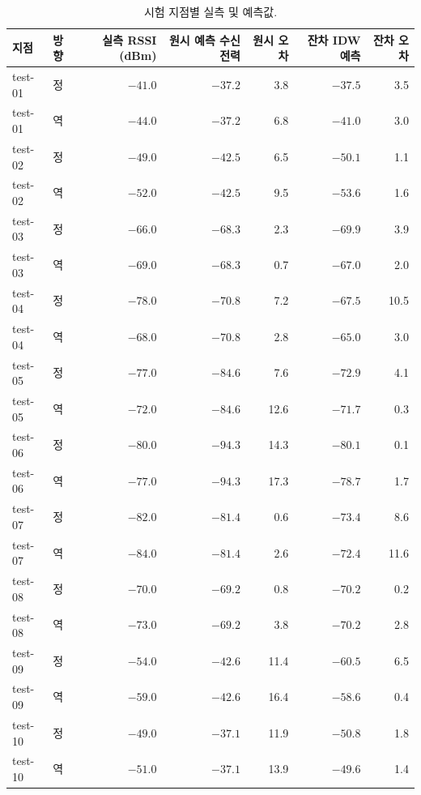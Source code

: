 \documentclass[11pt,a4paper]{article}
\begin{document}
\begin{table}[htbp]
  \centering\small
  \caption{시험 지점별 실측 및 예측값.}
  \label{tab:a2}
  \begin{tabular}{@{}llrrrrr@{}}
    \toprule
    지점 & 방향 & 실측 RSSI (dBm) & 원시 예측 수신 전력 & 원시 오차 & 잔차 IDW 예측 & 잔차 오차 \\
    \midrule
    test-01 & 정 & $-41.0$ & $-37.2$ & 3.8  & $-37.5$ & 3.5 \\
    test-01 & 역 & $-44.0$ & $-37.2$ & 6.8  & $-41.0$ & 3.0 \\
    test-02 & 정 & $-49.0$ & $-42.5$ & 6.5  & $-50.1$ & 1.1 \\
    test-02 & 역 & $-52.0$ & $-42.5$ & 9.5  & $-53.6$ & 1.6 \\
    test-03 & 정 & $-66.0$ & $-68.3$ & 2.3  & $-69.9$ & 3.9 \\
    test-03 & 역 & $-69.0$ & $-68.3$ & 0.7  & $-67.0$ & 2.0 \\
    test-04 & 정 & $-78.0$ & $-70.8$ & 7.2  & $-67.5$ & 10.5 \\
    test-04 & 역 & $-68.0$ & $-70.8$ & 2.8  & $-65.0$ & 3.0 \\
    test-05 & 정 & $-77.0$ & $-84.6$ & 7.6  & $-72.9$ & 4.1 \\
    test-05 & 역 & $-72.0$ & $-84.6$ & 12.6 & $-71.7$ & 0.3 \\
    test-06 & 정 & $-80.0$ & $-94.3$ & 14.3 & $-80.1$ & 0.1 \\
    test-06 & 역 & $-77.0$ & $-94.3$ & 17.3 & $-78.7$ & 1.7 \\
    test-07 & 정 & $-82.0$ & $-81.4$ & 0.6  & $-73.4$ & 8.6 \\
    test-07 & 역 & $-84.0$ & $-81.4$ & 2.6  & $-72.4$ & 11.6 \\
    test-08 & 정 & $-70.0$ & $-69.2$ & 0.8  & $-70.2$ & 0.2 \\
    test-08 & 역 & $-73.0$ & $-69.2$ & 3.8  & $-70.2$ & 2.8 \\
    test-09 & 정 & $-54.0$ & $-42.6$ & 11.4 & $-60.5$ & 6.5 \\
    test-09 & 역 & $-59.0$ & $-42.6$ & 16.4 & $-58.6$ & 0.4 \\
    test-10 & 정 & $-49.0$ & $-37.1$ & 11.9 & $-50.8$ & 1.8 \\
    test-10 & 역 & $-51.0$ & $-37.1$ & 13.9 & $-49.6$ & 1.4 \\
    \bottomrule
  \end{tabular}
\end{table}
\end{document}
